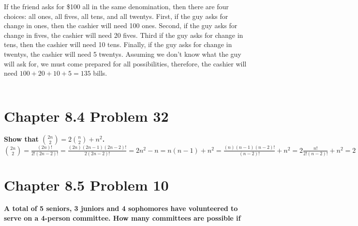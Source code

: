 \documentclass[10pt]{article}
\begin{document}
If the friend asks for \$100 all in the same denomination, then there are four choices: all ones, all fives, all tens, and all twentys.
First, if the guy asks for change in ones, then the cashier will need 100 ones.  Second, if the guy asks for change in fives, the 
cashier will need 20 fives.  Third if the guy asks for change in tens, then the cashier will need 10 tens.  Finally, if the guy asks for
change in twentys, the cashier will need 5 twentys.  Assuming we don't know what the guy will ask for, we must come prepared for all
possibilities, therefore, the cashier will need $100 + 20 + 10 + 5 = 135$ bills. \\\\


\section{Chapter 8.4 Problem 32}
\textbf{Show that $\binom{2n}{2} = 2\binom{n}{2} + n^2$.} \\

$\binom{2n}{2} = \frac{(2n)!}{2!(2n - 2)!} = \frac{(2n)(2n-1)(2n-2)!}{2(2n-2)!} = 2n^2 - n = n(n-1) + n^2 = \frac{(n)(n-1)(n-2)!}{(n-2)!} + n^2
= 2\frac{n!}{2!(n-2)!} + n^2 = 2\binom{n}{2} + n^2$


\section{Chapter 8.5 Problem 10}
\textbf{A total of 5 seniors, 3 juniors and 4 sophomores have volunteered to serve on a 4-person committee.  How many committees
are possible if}
\end{document}
